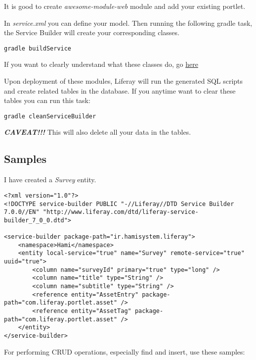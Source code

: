 It is good to create \textit{awesome-module-web} module and add your existing portlet.

In \textit{service.xml} you can define your model. Then running the following gradle task, the Service Builder will create your corresponding classes.

\lstset{language=bash}
\begin{lstlisting}
gradle buildService
\end{lstlisting}

If you want to clearly understand what these classes do, go  \href{https://dev.liferay.com/develop/tutorials/-/knowledge_base/7-0/running-service-builder-and-understanding-the-generated-code}{here}

Upon deployment of these modules, Liferay will run the generated SQL scripts and create related tables in the database. If you anytime want to clear these tables you can run this task:

\lstset{language=bash}
\begin{lstlisting}
gradle cleanServiceBuilder
\end{lstlisting}

\textit{\textbf{CAVEAT!!!}} This will also delete all your data in the tables.
\subsection{Samples}
I have created a \textit{Survey} entity.

\lstset{language=xml}
\begin{minipage}{\linewidth}
\begin{lstlisting}[caption=service.xml]
<?xml version="1.0"?>
<!DOCTYPE service-builder PUBLIC "-//Liferay//DTD Service Builder 7.0.0//EN" "http://www.liferay.com/dtd/liferay-service-builder_7_0_0.dtd">

<service-builder package-path="ir.hamisystem.liferay">
	<namespace>Hami</namespace>
	<entity local-service="true" name="Survey" remote-service="true" uuid="true">
		<column name="surveyId" primary="true" type="long" />
		<column name="title" type="String" />
		<column name="subtitle" type="String" />
		<reference entity="AssetEntry" package-path="com.liferay.portlet.asset" />
		<reference entity="AssetTag" package-path="com.liferay.portlet.asset" />
	</entity>
</service-builder>
\end{lstlisting}
\end{minipage}

For performing CRUD operations, especially find and insert, use these samples:



